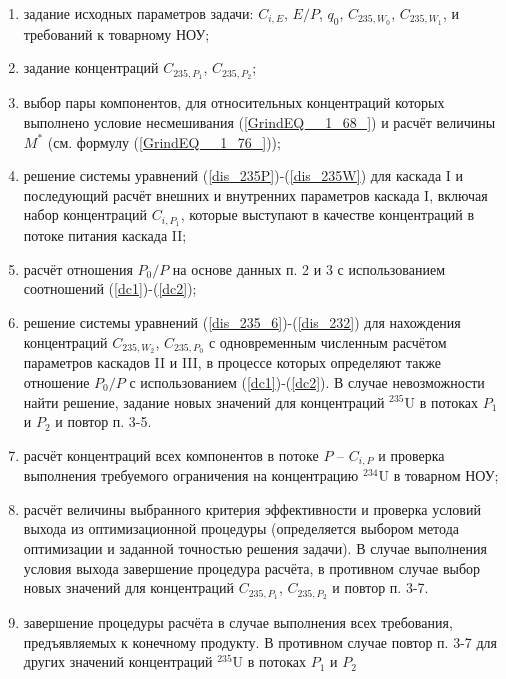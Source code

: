 {\begin{enumerate}
    \item задание исходных параметров задачи: $C_{i,E}$, $E/P$, $q_0$, $C_{235,{W_0}}$, $C_{235,{W_1}}$, и требований к товарному НОУ;
    \item задание концентраций $C_{235,{P_1}}$, $C_{235,{P_2}}$;
    \item выбор пары компонентов, для относительных концентраций которых выполнено условие несмешивания (\ref{GrindEQ__1_68_}) и расчёт величины $M^{*}$ (см. формулу (\ref{GrindEQ__1_76_}));
    \item решение системы уравнений (\ref{dis_235P})-(\ref{dis_235W}) для каскада I и последующий расчёт внешних и внутренних параметров каскада I, включая набор концентраций $C_{i,{P_1}}$, которые выступают в качестве концентраций в потоке питания каскада II;
    \item расчёт отношения ${P_0}/P$ на основе данных п. 2 и 3 с использованием соотношений (\ref{dc1})-(\ref{dc2});
    \item решение системы уравнений (\ref{dis_235_6})-(\ref{dis_232}) для нахождения концентраций $C_{235,{W_2}}$, $C_{235,{P_0}}$ с одновременным численным расчётом параметров каскадов II и III, в процессе которых определяют также отношение ${P_0}/P$ с использованием (\ref{dc1})-(\ref{dc2}). В случае невозможности найти решение, задание новых значений для концентраций $^{235}$U в потоках $P_1$ и $P_2$ и повтор п. 3-5. 
    \item расчёт концентраций всех компонентов в потоке $P$ -- $C_{i, P}$ и проверка выполнения требуемого ограничения на концентрацию $^{234}$U в товарном НОУ;
    \item расчёт величины выбранного критерия эффективности и проверка условий выхода из оптимизационной процедуры (определяется выбором метода оптимизации и заданной точностью решения задачи). В случае выполнения условия выхода завершение процедура расчёта, в противном случае выбор новых значений для концентраций $C_{235,{P_1}}$, $C_{235,{P_2}}$ и повтор п. 3-7.
    \item завершение процедуры расчёта в случае выполнения всех требования, предъявляемых к конечному продукту. В противном случае повтор п. 3-7 для других значений концентраций $^{235}$U в потоках $P_1$ и $P_2$
\end{enumerate}

}
